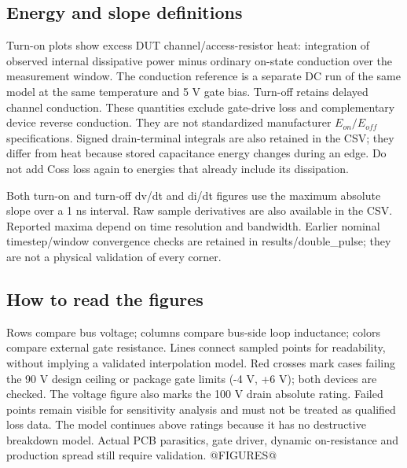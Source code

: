 \documentclass[a4paper,10pt]{article}
\begin{document}
\subsection{Energy and slope definitions}
Turn-on plots show excess DUT channel/access-resistor heat: integration of
observed internal dissipative power minus ordinary on-state conduction over
the measurement window. The conduction reference is a separate DC run of the
same model at the same temperature and 5 V gate bias. Turn-off retains delayed
channel conduction. These quantities exclude gate-drive loss and complementary
device reverse conduction. They are not standardized manufacturer $E_{on}/E_{off}$
specifications. Signed drain-terminal integrals are also retained in the CSV;
they differ from heat because stored capacitance energy changes during an edge.
Do not add Coss loss again to energies that already include its dissipation.

Both turn-on and turn-off dv/dt and di/dt figures use the maximum absolute slope
over a 1 ns interval. Raw sample derivatives are also available in the CSV.
Reported maxima depend on time resolution and bandwidth. Earlier nominal
timestep/window convergence checks are retained in results/double\_pulse;
they are not a physical validation of every corner.

\subsection{How to read the figures}
Rows compare bus voltage; columns compare bus-side loop inductance; colors
compare external gate resistance. Lines connect sampled points for readability,
without implying a validated interpolation model. Red crosses mark cases failing
the 90 V design ceiling or package gate limits (-4 V, +6 V); both devices are
checked. The voltage figure also marks the 100 V drain absolute rating.
Failed points remain visible for sensitivity analysis and must not be treated
as qualified loss data. The model continues above ratings because it has no
destructive breakdown model. Actual PCB parasitics, gate driver, dynamic
on-resistance and production spread still require validation.
@FIGURES@
\end{document}
